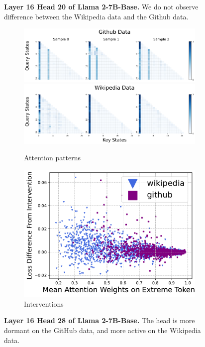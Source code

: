 \begin{figure}[h]
\begin{subfigure}{0.4\textwidth}
    \end{subfigure}
    \caption{\small \textbf{Layer 16 Head 20 of Llama 2-7B-Base.} We do not observe difference between the Wikipedia data and the Github data.}
    \label{fig:llama_l16h20}
\end{figure}

\begin{figure}[h]
    \centering
    \begin{subfigure}{0.575\textwidth}
        \centering
        \caption{Attention patterns}
        \includegraphics[width=\linewidth]{Figures/L16H28/attn_github_head28.png}
        \includegraphics[width=\linewidth]{Figures/L16H28/attn_wikipedia_head28.png}
    \end{subfigure}
    \begin{subfigure}{0.4\textwidth}
        \centering
        \caption{Interventions}
        \includegraphics[width=\linewidth]{Figures/L16H28/L16H28.pdf}
    \end{subfigure}
    \caption{\small \textbf{Layer 16 Head 28 of Llama 2-7B-Base.} The head is more dormant on the GitHub data, and more active on the Wikipedia data.}
    \label{fig:llama_l16h28}
\end{figure}


